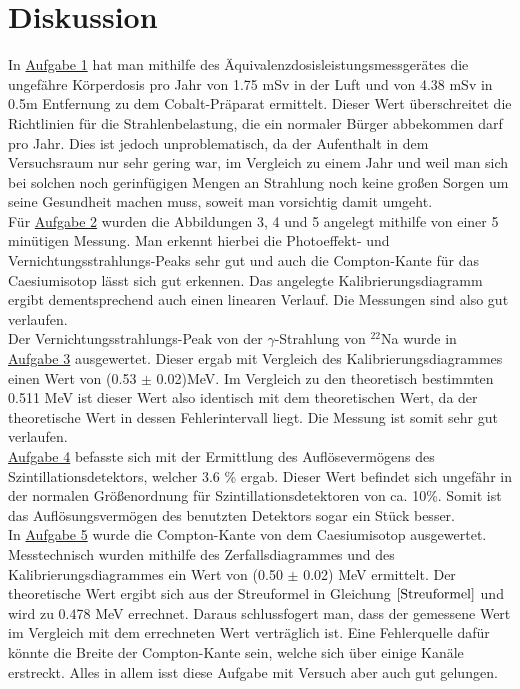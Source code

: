 \documentclass[11pt,a4paper]{article}
\begin{document}
   \section{Diskussion}
   In \underline{Aufgabe 1} hat man mithilfe des \"Aquivalenzdosisleistungsmessger\"ates die ungef\"ahre K\"orperdosis pro Jahr von 1.75 mSv in der Luft und von 4.38 mSv in 0.5m Entfernung zu dem Cobalt-Präparat ermittelt. 
   Dieser Wert überschreitet die Richtlinien f\"ur die Strahlenbelastung, die ein normaler B\"urger abbekommen darf pro Jahr. Dies ist jedoch unproblematisch, 
   da der Aufenthalt in dem Versuchsraum nur sehr gering war, im Vergleich zu einem Jahr und weil man sich bei solchen noch gerinf\"ugigen Mengen an Strahlung noch 
   keine gro\ss en Sorgen um seine Gesundheit machen muss, soweit man vorsichtig damit umgeht. \\
   F\"ur \underline{Aufgabe 2} wurden die Abbildungen 3, 4 und 5 angelegt mithilfe von einer 5 min\"utigen Messung. 
   Man erkennt hierbei die Photoeffekt- und Vernichtungsstrahlungs-Peaks sehr gut und auch die Compton-Kante f\"ur das Caesiumisotop l\"asst sich gut erkennen. 
   Das angelegte Kalibrierungsdiagramm ergibt dementsprechend auch einen linearen Verlauf. Die Messungen sind also gut verlaufen.\\
   Der Vernichtungsstrahlungs-Peak von der $\gamma$-Strahlung von $^{22}$Na wurde in \underline{Aufgabe 3} ausgewertet. 
   Dieser ergab mit Vergleich des Kalibrierungsdiagrammes einen Wert von (0.53 $\pm$ 0.02)MeV. 
   Im Vergleich zu den theoretisch bestimmten 0.511 MeV ist dieser Wert also identisch mit dem theoretischen Wert, 
   da der theoretische Wert in dessen Fehlerintervall liegt. Die Messung ist somit sehr gut verlaufen. \\
   \underline{Aufgabe 4} befasste sich mit der Ermittlung des Aufl\"oseverm\"ogens des Szintillationsdetektors, welcher 3.6 \% ergab.
   Dieser Wert befindet sich ungef\"ahr in der normalen Gr\"o\ss enordnung f\"ur Szintillationsdetektoren von ca. 10\%. 
   Somit ist das Aufl\"osungsverm\"ogen des benutzten Detektors sogar ein St\"uck besser. \\
   In \underline{Aufgabe 5} wurde die Compton-Kante von dem Caesiumisotop ausgewertet. Messtechnisch wurden mithilfe des Zerfallsdiagrammes und des Kalibrierungsdiagrammes 
   ein Wert von (0.50 $\pm$ 0.02) MeV ermittelt. 
   Der theoretische Wert ergibt sich aus der Streuformel in Gleichung $\ref{Streuformel}$ und wird zu 0.478 MeV errechnet. 
   Daraus schlussfogert man, dass der gemessene Wert im Vergleich mit dem errechneten Wert vertr\"aglich ist. Eine Fehlerquelle daf\"ur k\"onnte die Breite der Compton-Kante sein, welche sich \"uber einige Kan\"ale erstreckt. Alles in allem isst diese Aufgabe mit Versuch aber auch gut gelungen.\\
\end{document}

